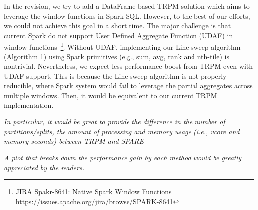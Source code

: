{In the revision, we try to add a DataFrame based TRPM solution 
which aims to leverage the window functions in Spark-SQL.
However, to the best of our efforts, we could not achieve this goal in a short time. 
The major challenge is that current Spark do not support User Defined Aggregate Function (UDAF)
in window functions~\footnote{JIRA Spakr-8641: Native Spark Window Functions \url{https://issues.apache.org/jira/browse/SPARK-8641}}. Without UDAF, implementing
our Line sweep algorithm (Algorithm 1) using Spark primitives (e.g., sum, avg, rank and nth-tile)
is nontrivial. Nevertheless, we expect less performance
boost from TRPM even with UDAF support. This is because the Line sweep algorithm is not
properly reducible, where Spark system would fail to leverage the partial aggregates
across multiple windows. Then, it would be equivalent to our current TRPM
implementation.
%
%
%
}

\emph{In particular, it would be great to provide the
difference in the number of partitions/splits, the amount of processing and
memory usage (i.e., vcore and memory seconds) between TRPM and SPARE}



\emph{A plot that breaks down the performance gain by each method would
be greatly appreciated by the readers.}

